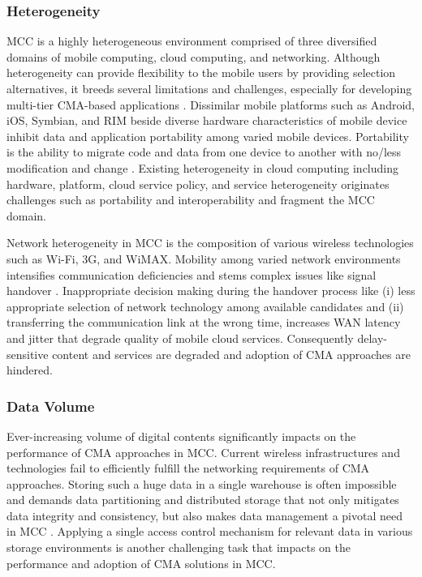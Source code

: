 \documentclass[publish]{IEEEtran}
\begin{document}
\subsubsection{Heterogeneity}
MCC is a highly heterogeneous environment comprised of three diversified domains of mobile computing, cloud computing, and networking. Although heterogeneity can provide flexibility to the mobile users by providing selection alternatives, it breeds several limitations and challenges, especially for developing multi-tier CMA-based applications \cite{Z2012}. Dissimilar mobile platforms such as Android, iOS, Symbian, and RIM beside diverse hardware characteristics of mobile device inhibit data and application portability among varied mobile devices. Portability is the ability to migrate code and data from one device to another with no/less modification and change \cite{ANSDIT}. Existing heterogeneity in cloud computing including hardware, platform, cloud service policy, and service heterogeneity originates challenges such as portability and interoperability and fragment the MCC domain. 

Network heterogeneity in MCC is the composition of various wireless technologies such as Wi-Fi, 3G, and WiMAX. Mobility among varied network environments intensifies communication deficiencies and stems complex issues like signal handover \cite{Nasser2006}. Inappropriate decision making during the handover process like (i) less appropriate selection of network technology among available candidates and (ii) transferring the communication link at the wrong time, increases WAN latency and jitter that degrade quality of mobile cloud services. Consequently delay-sensitive content and services are degraded \cite{Yan2010} and adoption of CMA approaches are hindered. 

\subsubsection{Data Volume}
Ever-increasing volume of digital contents \cite{Gantz2008} significantly impacts on the performance of CMA approaches in MCC. Current wireless infrastructures and technologies fail to efficiently fulfill the networking requirements of CMA approaches. Storing such a huge data in a single warehouse is often impossible and demands data partitioning and distributed storage that not only mitigates data integrity and consistency, but also makes data management a pivotal need in MCC \cite{Sakr2011}. Applying a single access control mechanism for relevant data in various storage environments is another challenging task that impacts on the performance and adoption of CMA solutions in MCC.
 
\end{document}
